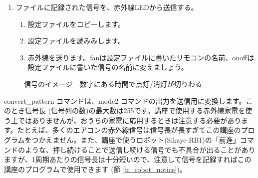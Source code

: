 \documentclass[text05.tex]{subfiles}
\begin{document}
\begin{enumerate}
\begin{enumerate}[1]
\begin{enumerate}[(1)]
\\onoff.patternに書かれた信号は、たとえば「1207 588 447 838 447 823 475 812 1218」のような文字列です。\\書き換えたら、しましょう (名前が05.lircd.confになっていることをしましょう)。
  \end{enumerate}
 \end{enumerate}
\item ファイルに記録された信号を、赤外線LEDから送信する。
 \begin{enumerate}[1]
  \item 設定ファイルをコピーします。 \\ 
  \item 設定ファイルを読みみします。\\ 
  \item 赤外線を送ります。fanは設定ファイルに書いたリモコンの名前、onoffは設定ファイルに書いた信号の名前に変えましょう。\\  
 \end{enumerate}
\end{enumerate}

\begin{figure}[H]
    \centering
 
    \caption{信号のイメージ　数字にある時間で点灯/消灯が切りわる}
\end{figure}

convert\_pattern コマンドは、mode2 コマンドの出力を送信用に変換します。このとき信号長 (信号列の数)の最大数は255です。講座で使用する赤外線家電を使う上ではありませんが、おうちの家電に応用するときは注意する必要があります。たとえば、多くのエアコンの赤外線信号は信号長が長すぎてこの講座のプログラムをつかえません。また、講座で使うロボット(Sikaye-RB1)の「前進」コマンドのような、押し続けることで送信し続ける信号でも不具合が出ることがありますが、1周期あたりの信号長は十分短いので、注意して信号を記録すればこの講座のプログラムで使用できます (節 \ref{ir_robot_notice})。\\

\begin{tcolorbox}[title=\useOmetoi]
    \begin{enumerate}
    \end{enumerate}
    \end{tcolorbox}
\end{document}
